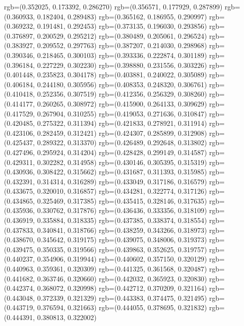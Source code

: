 {{{					rgb=(0.352025, 0.173392, 0.286270)
					rgb=(0.356571, 0.177929, 0.287899)
					rgb=(0.360933, 0.182404, 0.289483)
					rgb=(0.365162, 0.186955, 0.290997)
					rgb=(0.369232, 0.191481, 0.292453)
					rgb=(0.373135, 0.196030, 0.293856)
					rgb=(0.376897, 0.200529, 0.295212)
					rgb=(0.380489, 0.205061, 0.296524)
					rgb=(0.383927, 0.209552, 0.297763)
					rgb=(0.387207, 0.214030, 0.298968)
					rgb=(0.390346, 0.218465, 0.300103)
					rgb=(0.393336, 0.222874, 0.301189)
					rgb=(0.396184, 0.227229, 0.302230)
					rgb=(0.398880, 0.231556, 0.303226)
					rgb=(0.401448, 0.235823, 0.304178)
					rgb=(0.403881, 0.240022, 0.305089)
					rgb=(0.406184, 0.244180, 0.305956)
					rgb=(0.408353, 0.248320, 0.306761)
					rgb=(0.410418, 0.252356, 0.307519)
					rgb=(0.412356, 0.256329, 0.308260)
					rgb=(0.414177, 0.260265, 0.308972)
					rgb=(0.415900, 0.264133, 0.309629)
					rgb=(0.417529, 0.267904, 0.310255)
					rgb=(0.419053, 0.271636, 0.310847)
					rgb=(0.420485, 0.275322, 0.311394)
					rgb=(0.421833, 0.278921, 0.311914)
					rgb=(0.423106, 0.282459, 0.312421)
					rgb=(0.424307, 0.285899, 0.312908)
					rgb=(0.425437, 0.289322, 0.313370)
					rgb=(0.426489, 0.292648, 0.313802)
					rgb=(0.427496, 0.295924, 0.314204)
					rgb=(0.428428, 0.299149, 0.314587)
					rgb=(0.429311, 0.302282, 0.314958)
					rgb=(0.430146, 0.305395, 0.315319)
					rgb=(0.430936, 0.308422, 0.315662)
					rgb=(0.431687, 0.311393, 0.315985)
					rgb=(0.432391, 0.314314, 0.316289)
					rgb=(0.433049, 0.317186, 0.316579)
					rgb=(0.433675, 0.320010, 0.316857)
					rgb=(0.434281, 0.322774, 0.317126)
					rgb=(0.434865, 0.325469, 0.317385)
					rgb=(0.435415, 0.328146, 0.317635)
					rgb=(0.435936, 0.330762, 0.317876)
					rgb=(0.436436, 0.333356, 0.318109)
					rgb=(0.436919, 0.335884, 0.318335)
					rgb=(0.437385, 0.338374, 0.318554)
					rgb=(0.437833, 0.340841, 0.318766)
					rgb=(0.438259, 0.343266, 0.318973)
					rgb=(0.438670, 0.345642, 0.319175)
					rgb=(0.439075, 0.348006, 0.319373)
					rgb=(0.439475, 0.350335, 0.319566)
					rgb=(0.439863, 0.352625, 0.319757)
					rgb=(0.440237, 0.354906, 0.319944)
					rgb=(0.440602, 0.357150, 0.320129)
					rgb=(0.440963, 0.359361, 0.320309)
					rgb=(0.441325, 0.361568, 0.320487)
					rgb=(0.441682, 0.363746, 0.320660)
					rgb=(0.442032, 0.365923, 0.320830)
					rgb=(0.442374, 0.368072, 0.320998)
					rgb=(0.442712, 0.370209, 0.321164)
					rgb=(0.443048, 0.372339, 0.321329)
					rgb=(0.443383, 0.374475, 0.321495)
					rgb=(0.443719, 0.376594, 0.321663)
					rgb=(0.444055, 0.378695, 0.321832)
					rgb=(0.444391, 0.380813, 0.322002)
}}}
